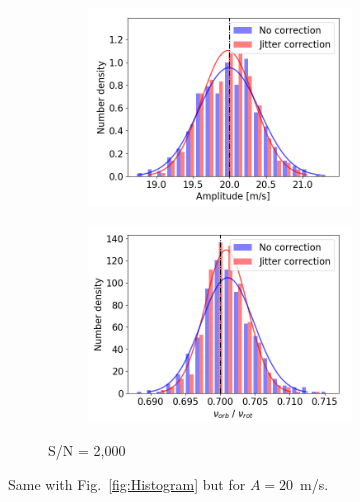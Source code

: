 \begin{figure}[tbp]
\begin{subfigure}[b]{1.0\textwidth}
    		\begin{subfigure}[b]{0.49\textwidth}
        		\includegraphics[width=\textwidth]{./Figures/Methods/Histogram_new1_p20_sn2000.png}
		\end{subfigure}
		\begin{subfigure}[b]{0.49\textwidth}        		
        		\includegraphics[width=\textwidth]{./Figures/Methods/Histogram_new2_p20_sn2000.png}
        	\end{subfigure}
        	\caption{S/N = 2,000}
    \end{subfigure}	       
    \caption[Histogram of recovered orbital parameters ($A = 20$~m/s)]
    {Same with Fig.~\ref{fig:Histogram} but for $A = 20$~m/s.}
\label{fig:Histogram20}
\end{figure}    

